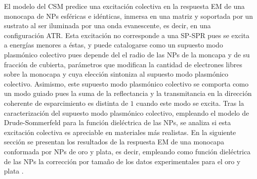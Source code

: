 El modelo del CSM predice una excitación colectiva en la respuesta EM de una monocapa de NPs esféricas e idénticas, inmersa en una matriz y soportada por un sustrato al ser iluminada por una onda evanescente, es decir, en una configuración ATR. Esta excitación no corresponde a una SP-SPR pues se excita a energías menores a éstas, y puede catalogarse como un supuesto modo plasmónico colectivo pues depende del el radio de las NPs de la moncapa y de su fracción de cubierta, parámetros que modifican la cantidad de electrones libres sobre la monocapa y cuya elección sintoniza al supuesto modo plasmónico colectivo. Asimismo, este supuesto modo plasmónico colectivo se comporta como un modo guiado pues la suma de la reflectancia y la transmitancia en la dirección coherente de esparcimiento es distinta de $1$ cuando este modo se excita. Tras la caracterización del supuesto modo plasmónico colectivo, empleando el modelo de Drude-Sommerfeld para la función dieléctrica de las NPs, se analiza si esta excitación colectiva es apreciable en materiales más realistas. En la siguiente sección se presentan los resultados de la respuesta EM de una monocapa conformada por NPs de oro y plata, es decir, empleando como función dieléctrica de las NPs la corrección por tamaño de los datos experimentales para el oro y plata \cite{johnson1972constants}.

